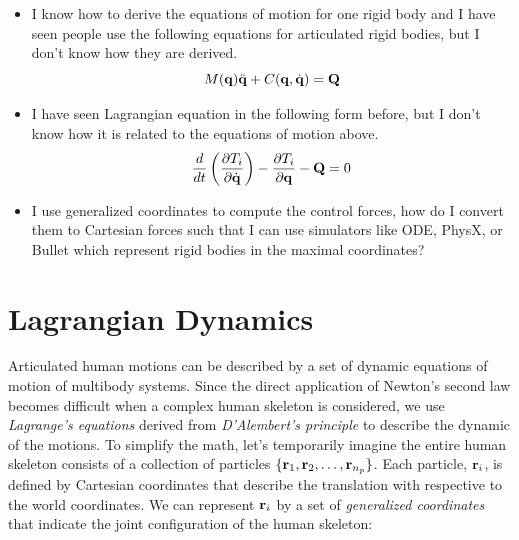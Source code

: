\begin{itemize}
\item I know how to derive the equations of motion for one rigid body
  and I have seen people use the following equations for articulated
  rigid bodies, but I don't know how they are derived.
\begin{equation}
M(\mathbf{q}) \ddot{\mathbf{q}} + C(\mathbf{q}, \dot{\mathbf{q}})  = \mathbf{Q} \nonumber
\end{equation}

\item I have seen Lagrangian equation in the following form before, but I
  don't know how it is related to the equations of motion above.
\begin{equation}\label{eq:lagrangian_dyn}
    \frac{d}{dt} \left( \frac{\partial T_i}{\partial
    \dot{\mathbf{q}}} \right) - \frac{\partial T_i}{\partial
    \mathbf{q}} - \mathbf{Q} = 0 \nonumber
\end{equation}

\item I use generalized coordinates to compute the control forces, how do I convert them to Cartesian forces such that I can use simulators like ODE, PhysX, or Bullet which represent rigid bodies in the maximal coordinates?

\end{itemize}



\newpage
\section{Lagrangian Dynamics}
\label{sec:lagrangian}
Articulated human motions can be described by a set of dynamic
equations of motion of multibody systems. Since the direct application
of Newton's second law becomes difficult when a complex human skeleton
is considered, we use \emph{Lagrange's equations} derived from
\emph{D'Alembert's principle} to describe the dynamic of the
motions. To simplify the math, let's temporarily imagine the entire
human skeleton consists of a collection of particles
$\{\mathbf{r}_1, \mathbf{r}_2, \ldots,
\mathbf{r}_{n_p}\}$.  Each particle, $\mathbf{r}_i$,
is defined by Cartesian coordinates that describe the translation with
respective to the world coordinates.  We can represent
$\mathbf{r}_i$ by a set of \emph{generalized coordinates} that
indicate the joint configuration of the human skeleton:

